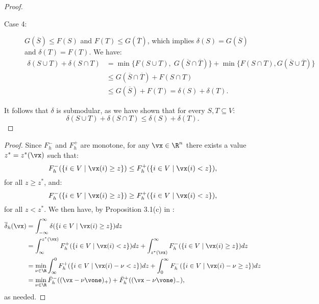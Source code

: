 \documentclass[letterpaper]{article}
\begin{document}
\begin{proof}
\begin{description}
\item[Case 4:] $G(\overline{S}) \leq F(S)$ and $F(T) \leq G(\overline{T})$, which implies  $\delta(S) = G(\overline{S})$ and $\delta(T) = F(T)$. We have:
\begin{align*}
    \delta(S \cup T) + \delta(S \cap T) &= \min\{F(S \cup T), \; G(\overline{S} \cap \overline{T})\} + \min\{F(S \cap T) , G(\overline{S} \cup \overline{T})\}\\
    &\leq G(\overline{S}\cap \overline{T}) + F(S \cap T) \\
    &\leq G(\overline{S}) + F(T)   = \delta(S) + \delta(T).
\end{align*}
\end{description}
It follows that $\delta$ is submodular, as we have shown that for every $S,T\subseteq V$:
\[
    \delta(S\cup T) + \delta (S \cap T)  \leq \delta(S) + \delta(T).
\]
\end{proof}

\formoflovaszextension*
\begin{proof}
Since $F^-_h$ and $F^+_h$ are monotone, for any $\vx \in \R^n$ there exists a value $z^* = z^*(\vx)$ such that:
\[
    F^-_h(\{i\in V \mid \vx(i) \geq z\}) \leq F^+_h(\{i\in V \mid \vx(i) < z\}),
\]
for all $z\geq z^*$, and:
\[
    F^-_h(\{i\in V \mid \vx(i) \geq z\}) \geq F^+_h(\{i\in V \mid \vx(i) < z\}),
\]
for all $z < z^*$.
We then have, by Proposition 3.1(c) in \cite{bach2013learning}:
\begin{align*}
\overline{\delta}_h (\vx) &= \int_{-\infty}^\infty \delta(\{i\in V \mid \vx(i) \geq z\}) dz \\
&=\int_{\infty}^{z^*(\vx)} F^+_h(\{i \in V \mid \vx(i) < z\}) dz + \int_{z^*(\vx)}^\infty F^-_h(\{i \in V \mid \vx(i) \geq z\})dz\\
&= \min_{\nu \in \R} \int_{\infty}^0 F^+_h(\{i \in V \mid \vx(i) -\nu < z\}) dz + \int_{0}^\infty F^-_h(\{i \in V \mid \vx(i) -\nu \geq z\})dz\\
&= \min_{\nu \in \R}\bar{F}^-_h((\vx - \nu \vone)_+ ) + \bar{F}^+_h((\vx - \nu \vone)_-),
\end{align*}
as needed.
\end{proof}
\end{document}
